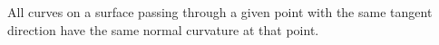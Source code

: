 All curves on a surface passing through a given point with the same tangent direction have the same normal curvature at that point.